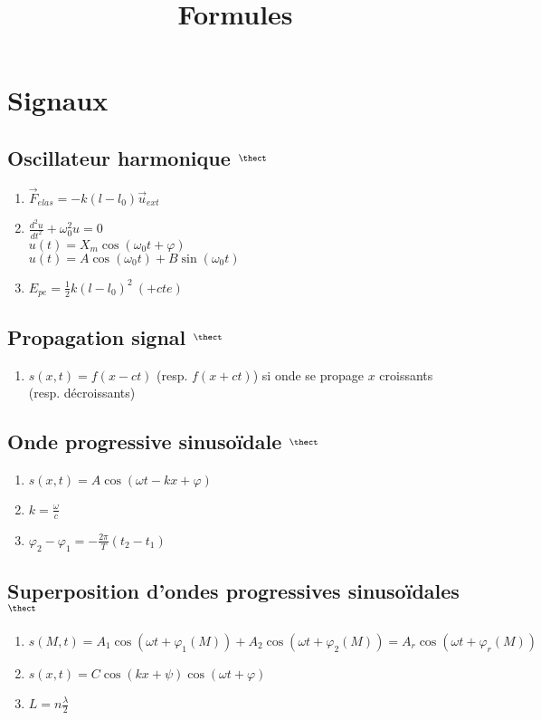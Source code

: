 \documentclass[fleqn]{article}
\title{Formules}
\date{}
\theoremstyle{definition} \newtheorem*{defi}{D\'efinition}
\theoremstyle{definition} \newtheorem*{theo}{Th\'eor\`eme}
\theoremstyle{definition} \newtheorem*{coro}{Corollaire}
\theoremstyle{remark} \newtheorem*{rqs}{Remarques}
\theoremstyle{definition} \newtheorem*{prop}{Propri\'et\'e}
\begin{document}
\maketitle



\section{Signaux}
\subsection{Oscillateur harmonique $^\thect$}
\begin{enumerate}
	\item $\vec{F}_{elas} = -k(l - l_0)\vec{u}_{ext}$
	\item $\frac{d^2u}{dt^2} + \omega_0^2 u = 0$ \\
		$u(t) = X_m \cos(\omega_0 t + \varphi)$\\
		$u(t) = A\cos(\omega_0 t) + B\sin(\omega_0 t)$
	\item  $E_{pe} = \frac{1}{2}k(l - l_0)^2\ (+cte)$
\end{enumerate}

\subsection{Propagation signal $^\thect$}
\begin{enumerate}
	\item $s(x,t) = f(x - ct)$ (resp. $f(x + ct)$) si onde se propage $x$ croissants (resp. d\'ecroissants)
\end{enumerate}

\subsection{Onde progressive sinuso\"idale $^\thect$}
\begin{enumerate}
	\item $s(x,t) = A\cos(\omega t - kx + \varphi)$
	\item $k =  \frac{\omega}{c}$
	\item $\varphi_2 - \varphi_1 = -\frac{2\pi}{T} (t_2 - t_1)$
\end{enumerate}

\subsection{Superposition d'ondes progressives sinuso\"idales $^\thect$}
\begin{enumerate}
	\item $s(M,t) = A_1\cos(\omega t + \varphi_1 (M)) + A_2\cos(\omega t + \varphi_2 (M)) = A_r\cos(\omega t + \varphi_r (M))$
	\item $s(x,t) = C\cos(kx + \psi)\cos(\omega t + \varphi)$
	\item $L = n \frac{\lambda}{2}$
\end{enumerate}
\end{document}
